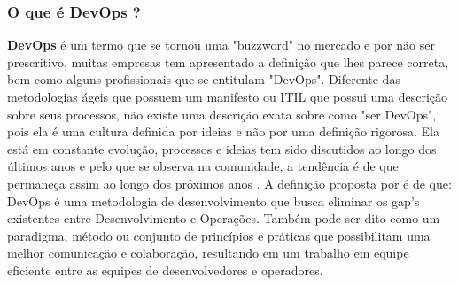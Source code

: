 \documentclass[twoside,english,brazilian]{UNISINOSartigo}
\begin{document}
\subsubsection{O que é DevOps ?}

\textbf{DevOps} é um termo que se tornou uma "buzzword" no mercado e  por não ser prescritivo, muitas empresas tem apresentado a definição que lhes parece correta, bem como alguns profissionais que se entitulam "DevOps". 
Diferente das metodologias ágeis que possuem um manifesto ou ITIL que possui uma descrição sobre seus processos, não existe uma descrição exata sobre como "ser DevOps", pois ela é uma cultura definida por ideias e não por uma definição rigorosa. Ela está em constante evolução, processos e ideias tem sido discutidos ao longo dos últimos anos e pelo que se observa na comunidade, a tendência é de que permaneça assim ao longo dos próximos anos  \cite{Fallis2013}.  \newline
A definição proposta por \citep{Jabbari2016} é de que: DevOps é uma metodologia de desenvolvimento que busca eliminar os gap's existentes entre Desenvolvimento e Operações. Também pode ser dito como um paradigma, método ou conjunto de princípios e práticas que possibilitam uma melhor comunicação e colaboração, resultando em um trabalho em equipe eficiente entre as equipes de desenvolvedores e operadores.
\end{document}
